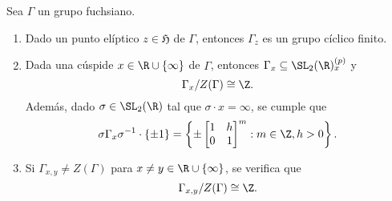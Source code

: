 \documentclass[teoria-numeros.tex]{subfiles}
\begin{document}
\begin{thm}
	Sea $\Gamma$ un grupo fuchsiano.
	\begin{enumerate}
		\item Dado un punto elíptico $z \in \mathfrak{H}$   de $\Gamma$, entonces $\Gamma_z$ es un grupo cíclico finito.
		\item Dada una cúspide $x \in \R \cup \{ \infty \}$ de $\Gamma$, entonces $\Gamma_x \subseteq \SL_2(\R)_x^{(p)}$ y
			\[
				\Gamma_x / Z(\Gamma) \cong \Z.
			\]
			Además, dado $\sigma \in \SL_2(\R)$ tal que $\sigma \cdot x = \infty$, se cumple que
			\[
				\sigma \Gamma_x \sigma^{-1}\cdot \{ \pm 1 \} = \left\{ \pm
					\begin{bmatrix}
						1 & h \\
						0 & 1
					\end{bmatrix}^m : m \in \Z, h > 0
				\right\}.
			\]
		\item Si $\Gamma_{x, y} \ne Z(\Gamma)$ para $x \ne y \in \R \cup \{ \infty \}$, se verifica que
			\[
				\Gamma_{x,y} / Z(\Gamma) \cong \Z.
			\]
	\end{enumerate}
\end{thm}
\end{document}
